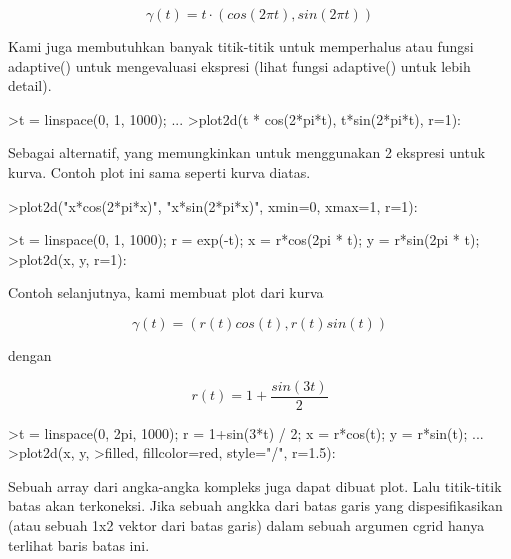 \documentclass[a4paper,10pt]{article}
\begin{document}
\begin{eulernotebook}
\begin{eulercomment}
\begin{eulercomment}
\begin{eulercomment}
\begin{eulercomment}
\begin{eulercomment}
\end{eulercomment}
\begin{eulerformula}
\[
\gamma(t) = t \cdot (cos(2\pi t), sin(2 \pi t))
\]
\end{eulerformula}
\begin{eulercomment}
Kami juga membutuhkan banyak titik-titik untuk memperhalus atau fungsi
adaptive() untuk mengevaluasi ekspresi (lihat fungsi adaptive() untuk
lebih detail).
\end{eulercomment}
\begin{eulerprompt}
>t = linspace(0, 1, 1000); ...
>plot2d(t * cos(2*pi*t), t*sin(2*pi*t), r=1):
\end{eulerprompt}
\begin{eulercomment}
Sebagai alternatif, yang memungkinkan untuk menggunakan 2 ekspresi
untuk kurva. Contoh plot ini sama seperti kurva diatas.
\end{eulercomment}
\begin{eulerprompt}
>plot2d("x*cos(2*pi*x)", "x*sin(2*pi*x)", xmin=0, xmax=1, r=1):
\end{eulerprompt}
\begin{eulerprompt}
>t = linspace(0, 1, 1000); r = exp(-t); x = r*cos(2pi * t); y = r*sin(2pi * t);
>plot2d(x, y, r=1):
\end{eulerprompt}
\begin{eulercomment}
Contoh selanjutnya, kami membuat plot dari kurva

\end{eulercomment}
\begin{eulerformula}
\[
\gamma(t) = (r(t)cos(t), r(t)sin(t))
\]
\end{eulerformula}
\begin{eulercomment}
dengan

\end{eulercomment}
\begin{eulerformula}
\[
r(t) = 1 + \frac{sin(3t)}{2}
\]
\end{eulerformula}
\begin{eulerprompt}
>t = linspace(0, 2pi, 1000); r = 1+sin(3*t) / 2; x = r*cos(t); y = r*sin(t); ...
>plot2d(x, y, >filled, fillcolor=red, style="/", r=1.5):
\end{eulerprompt}
\begin{eulercomment}
Sebuah array dari angka-angka kompleks juga dapat dibuat plot. Lalu
titik-titik batas akan terkoneksi. Jika sebuah angkka dari batas garis
yang dispesifikasikan (atau sebuah 1x2 vektor dari batas garis) dalam
sebuah argumen cgrid hanya terlihat baris batas ini.


\end{eulercomment}
\end{eulercomment}
\end{eulercomment}
\end{eulercomment}
\end{eulercomment}
\end{eulernotebook}
\end{document}
